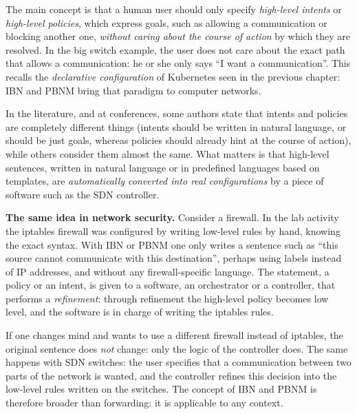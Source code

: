 The main concept is that a human user should only specify \emph{high-level intents} or \emph{high-level policies}, which express goals, such as allowing a communication or blocking another one, \emph{without caring about the course of action} by which they are resolved. In the big switch example, the user does not care about the exact path that allows a communication: he or she only says ``I want a communication''. This recalls the \emph{declarative configuration} of Kubernetes seen in the previous chapter: IBN and PBNM bring that paradigm to computer networks.

In the literature, and at conferences, some authors state that intents and policies are completely different things (intents should be written in natural language, or should be just goals, whereas policies should already hint at the course of action), while others consider them almost the same. What matters is that high-level sentences, written in natural language or in predefined languages based on templates, are \emph{automatically converted into real configurations} by a piece of software such as the SDN controller.

\begin{notebox}
	\textbf{The same idea in network security.} Consider a firewall. In the lab activity the iptables firewall was configured by writing low-level rules by hand, knowing the exact syntax. With IBN or PBNM one only writes a sentence such as ``this source cannot communicate with this destination'', perhaps using labels instead of IP addresses, and without any firewall-specific language. The statement, a policy or an intent, is given to a software, an orchestrator or a controller, that performs a \emph{refinement}: through refinement the high-level policy becomes low level, and the software is in charge of writing the iptables rules.

	\medskip
	If one changes mind and wants to use a different firewall instead of iptables, the original sentence does \emph{not} change: only the logic of the controller does. The same happens with SDN switches: the user specifies that a communication between two parts of the network is wanted, and the controller refines this decision into the low-level rules written on the switches. The concept of IBN and PBNM is therefore broader than forwarding: it is applicable to any context.
\end{notebox}
